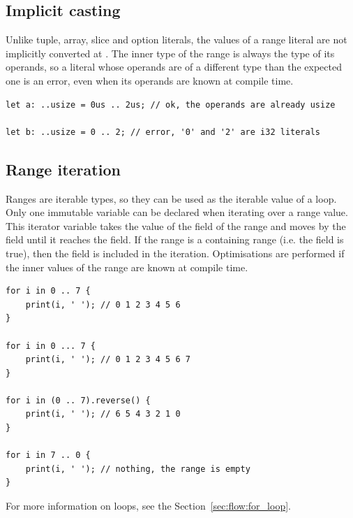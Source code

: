 \subsection{Implicit casting}

Unlike tuple, array, slice and option literals, the values of a range literal
are not implicitly converted at . The inner type of the range is
always the type of its operands, so a literal whose operands are of a different
type than the expected one is an error, even when its operands are known at
compile time.

\begin{lstlisting}[style=coloredverbatimError]
let a: ..usize = 0us .. 2us; // ok, the operands are already usize

let b: ..usize = 0 .. 2; // error, '0' and '2' are i32 literals
\end{lstlisting}

\subsection{Range iteration}

 Ranges are iterable types, so they can be used as the iterable value of a
  loop. Only one immutable variable can be declared when iterating
 over a range value. This iterator variable takes the value of the 
 field of the range and moves by the  field until it reaches
 the  field. If the range is a containing range (i.e. the
  field is true), then the  field is included in
 the iteration. Optimisations are performed if the inner values of the range are
 known at compile time.

\begin{lstlisting}[style=coloredverbatim]
for i in 0 .. 7 {
    print(i, ' '); // 0 1 2 3 4 5 6
}

for i in 0 ... 7 {
    print(i, ' '); // 0 1 2 3 4 5 6 7
}

for i in (0 .. 7).reverse() {
    print(i, ' '); // 6 5 4 3 2 1 0
}

for i in 7 .. 0 {
    print(i, ' '); // nothing, the range is empty
}
\end{lstlisting}

For more information on  loops, see the Section~\ref{sec:flow:for_loop}.

\vfill%
\pagebreak
